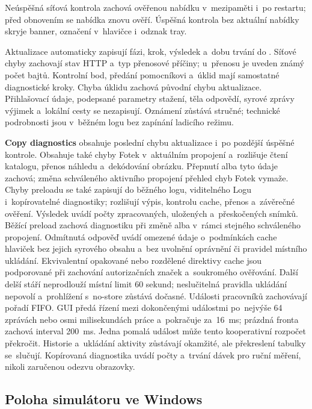 \documentclass[11pt,a4paper]{article}
\newcommand{\ui}[1]{\textbf{#1}}
\begin{document}
Neúspěšná síťová kontrola zachová ověřenou nabídku v~mezipaměti i~po restartu;
před obnovením se nabídka znovu ověří. Úspěšná kontrola bez aktuální nabídky
skryje banner, označení v~hlavičce i~odznak tray.

Aktualizace automaticky zapisují fázi, krok, výsledek a~dobu trvání do
. Síťové chyby zachovají stav HTTP a~typ přenosové příčiny;
u~přenosu je uveden známý počet bajtů. Kontrolní bod, předání pomocníkovi
a~úklid mají samostatné diagnostické kroky. Chyba úklidu zachová původní chybu
aktualizace. Přihlašovací údaje, podepsané parametry stažení, těla odpovědí,
syrové zprávy výjimek a~lokální cesty se nezapisují. Oznámení zůstává stručné;
technické podrobnosti jsou v~běžném logu bez zapínání ladicího režimu.

\ui{Copy diagnostics} obsahuje poslední chybu aktualizace i~po pozdější
úspěšné kontrole. Obsahuje také chyby Fotek v~aktuálním propojení a~rozlišuje
čtení katalogu, přenos náhledu a~dekódování obrázku. Přepnutí alba tyto údaje
zachová; změna schváleného aktivního propojení přehled chyb Fotek vymaže.
Chyby preloadu se také zapisují do běžného logu, viditelného Logu
i~kopírovatelné diagnostiky; rozlišují výpis, kontrolu cache, přenos
a~závěrečné ověření. Výsledek uvádí počty zpracovaných, uložených
a~přeskočených snímků. Běžící preload zachová diagnostiku při změně alba
v~rámci stejného schváleného propojení. Odmítnutá odpověď uvádí omezené údaje
o~podmínkách cache hlaviček bez jejich syrového obsahu a~bez uvolnění
oprávnění či pravidel místního ukládání.
Ekvivalentní opakované nebo rozdělené direktivy cache jsou podporované při
zachování autorizačních značek a~soukromého ověřování. Další delší stáří
neprodlouží místní limit 60 sekund; neslučitelná pravidla ukládání nepovolí
a~prohlížení s~no-store zůstává dočasné.
Události pracovníků zachovávají pořadí FIFO. GUI předá řízení mezi dokončenými
událostmi po~nejvýše 64 zprávách nebo osmi milisekundách práce a~pokračuje
za~16~ms; prázdná fronta zachová interval 200~ms. Jedna pomalá událost může
tento kooperativní rozpočet překročit. Historie a~ukládání aktivity zůstávají
okamžité, ale překreslení tabulky se~slučují. Kopírovaná diagnostika uvádí počty
a~trvání dávek pro ruční měření, nikoli zaručenou odezvu obrazovky.

\subsection{Poloha simulátoru ve Windows}
\end{document}
